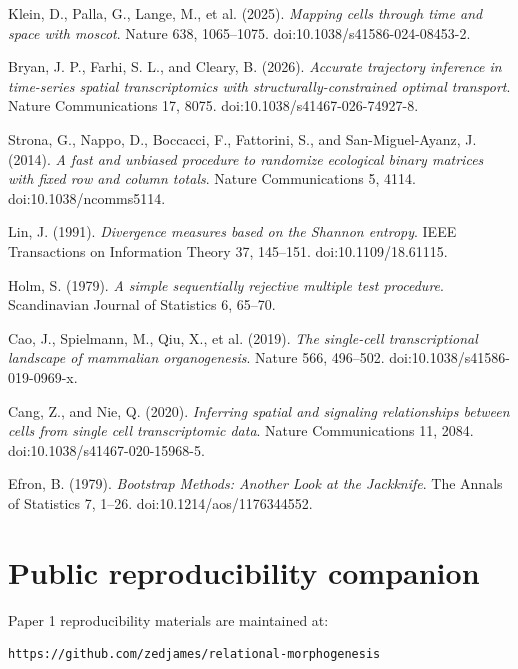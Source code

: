 \documentclass[11pt]{article}
\begin{document}
\begin{description}[leftmargin=1.2cm,labelwidth=1cm]
\item[R10.] Klein, D., Palla, G., Lange, M., et al. (2025).
\emph{Mapping cells through time and space with moscot}.
Nature 638, 1065--1075.
doi:10.1038/s41586-024-08453-2.

\item[R11.] Bryan, J. P., Farhi, S. L., and Cleary, B. (2026).
\emph{Accurate trajectory inference in time-series spatial transcriptomics with structurally-constrained optimal transport}.
Nature Communications 17, 8075.
doi:10.1038/s41467-026-74927-8.

\item[R12.] Strona, G., Nappo, D., Boccacci, F., Fattorini, S., and San-Miguel-Ayanz, J. (2014).
\emph{A fast and unbiased procedure to randomize ecological binary matrices with fixed row and column totals}.
Nature Communications 5, 4114.
doi:10.1038/ncomms5114.

\item[R13.] Lin, J. (1991).
\emph{Divergence measures based on the Shannon entropy}.
IEEE Transactions on Information Theory 37, 145--151.
doi:10.1109/18.61115.

\item[R14.] Holm, S. (1979).
\emph{A simple sequentially rejective multiple test procedure}.
Scandinavian Journal of Statistics 6, 65--70.

\item[R15.] Cao, J., Spielmann, M., Qiu, X., et al. (2019).
\emph{The single-cell transcriptional landscape of mammalian organogenesis}.
Nature 566, 496--502.
doi:10.1038/s41586-019-0969-x.

\item[R16.] Cang, Z., and Nie, Q. (2020).
\emph{Inferring spatial and signaling relationships between cells from single cell transcriptomic data}.
Nature Communications 11, 2084.
doi:10.1038/s41467-020-15968-5.

\item[R17.] Efron, B. (1979).
\emph{Bootstrap Methods: Another Look at the Jackknife}.
The Annals of Statistics 7, 1--26.
doi:10.1214/aos/1176344552.
\end{description}
\newpage
\section{Public reproducibility companion}
\label{app:provenance}

Paper 1 reproducibility materials are maintained at:
\begin{verbatim}
https://github.com/zedjames/relational-morphogenesis
\end{verbatim}
\end{document}
